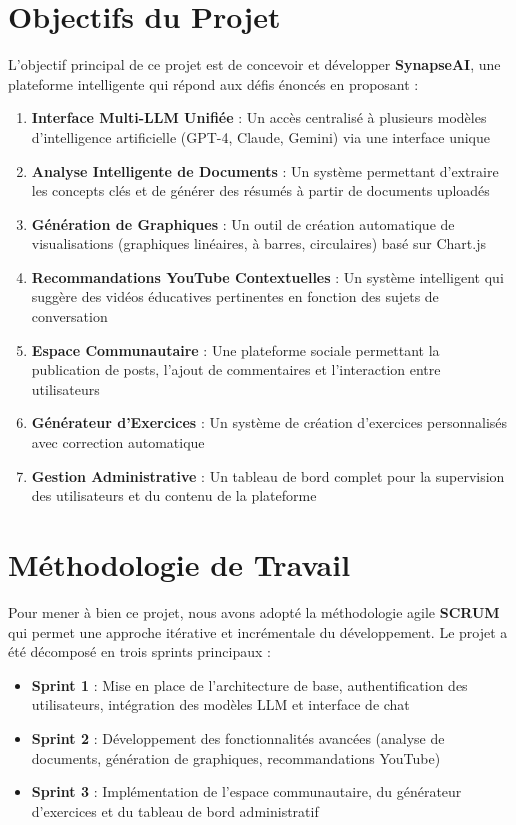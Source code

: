 \section*{Objectifs du Projet}

L'objectif principal de ce projet est de concevoir et développer \textbf{SynapseAI}, une plateforme intelligente qui répond aux défis énoncés en proposant :

\begin{enumerate}
    \item \textbf{Interface Multi-LLM Unifiée} : Un accès centralisé à plusieurs modèles d'intelligence artificielle (GPT-4, Claude, Gemini) via une interface unique
    \item \textbf{Analyse Intelligente de Documents} : Un système permettant d'extraire les concepts clés et de générer des résumés à partir de documents uploadés
    \item \textbf{Génération de Graphiques} : Un outil de création automatique de visualisations (graphiques linéaires, à barres, circulaires) basé sur Chart.js
    \item \textbf{Recommandations YouTube Contextuelles} : Un système intelligent qui suggère des vidéos éducatives pertinentes en fonction des sujets de conversation
    \item \textbf{Espace Communautaire} : Une plateforme sociale permettant la publication de posts, l'ajout de commentaires et l'interaction entre utilisateurs
    \item \textbf{Générateur d'Exercices} : Un système de création d'exercices personnalisés avec correction automatique
    \item \textbf{Gestion Administrative} : Un tableau de bord complet pour la supervision des utilisateurs et du contenu de la plateforme
\end{enumerate}

\section*{Méthodologie de Travail}

Pour mener à bien ce projet, nous avons adopté la méthodologie agile \textbf{SCRUM} qui permet une approche itérative et incrémentale du développement. Le projet a été décomposé en trois sprints principaux :

\begin{itemize}
    \item \textbf{Sprint 1} : Mise en place de l'architecture de base, authentification des utilisateurs, intégration des modèles LLM et interface de chat
    \item \textbf{Sprint 2} : Développement des fonctionnalités avancées (analyse de documents, génération de graphiques, recommandations YouTube)
    \item \textbf{Sprint 3} : Implémentation de l'espace communautaire, du générateur d'exercices et du tableau de bord administratif
\end{itemize}

